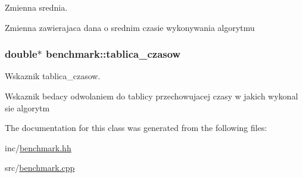 Zmienna srednia. 

Zmienna zawierajaca dana o srednim czasie wykonywania algorytmu \hypertarget{classbenchmark_ab8768783d6cb3c6e7a6f9d4127ce48eb}{
\subsubsection[{tablica\+\_\+czasow}]{\setlength{\rightskip}{0pt plus 5cm}double$\ast$ benchmark\+::tablica\+\_\+czasow\hspace{0.3cm}{\ttfamily [private]}}}\label{classbenchmark_ab8768783d6cb3c6e7a6f9d4127ce48eb}


Wskaznik tablica\+\_\+czasow. 

Wskaznik bedacy odwolaniem do tablicy przechowujacej czasy w jakich wykonal sie algorytm 

The documentation for this class was generated from the following files\+:\begin{DoxyCompactItemize}
\item 
inc/\hyperlink{benchmark_8hh}{benchmark.\+hh}\item 
src/\hyperlink{benchmark_8cpp}{benchmark.\+cpp}\end{DoxyCompactItemize}
